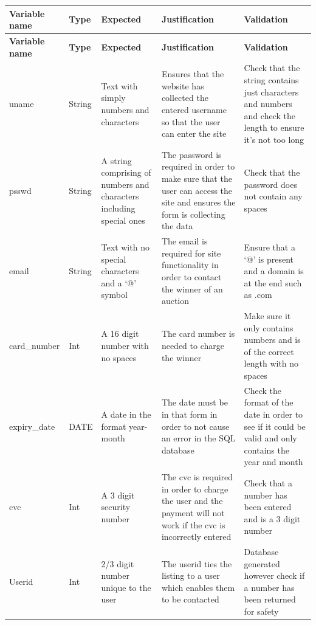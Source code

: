 \begin{center}
\begin{longtable}{|P{1.7cm}|P{1cm}|P{3.5cm}|P{3cm}|P{3cm}|}
  \hline
  \textbf{Variable name} & \textbf{Type} & \textbf{Expected} & \textbf{Justification} & \textbf{Validation} \\
  \hline
  \endfirsthead
  \hline
  \textbf{Variable name} & \textbf{Type} & \textbf{Expected} & \textbf{Justification} & \textbf{Validation} \\
  \hline
  \endhead
  \hline 

  \endfoot
  \endlastfoot
  
    uname & String & Text with simply numbers and characters & Ensures that the website has collected the entered username so that the user can enter the site & Check that the string contains just characters and numbers and check the length to ensure it’s not too long \\ \hline
        psswd & String & A string comprising of numbers and characters including special ones & The password is required in order to make sure that the user can access the site and ensures the form is collecting the data & Check that the password does not contain any spaces \\ \hline
        email & String & Text with no special characters and a ‘@’ symbol & The email is required for site functionality in order to contact the winner of an auction & Ensure that a ‘@’ is present and a domain is at the end such as .com \\ \hline
        card\_number & Int & A 16 digit number with no spaces & The card number is needed to charge the winner & Make sure it only contains numbers and is of the correct length with no spaces \\ \hline
        expiry\_date & DATE & A date in the format year-month & The date must be in that form in order to not cause an error in the SQL database & Check the format of the date in order to see if it could be valid and only contains the year and month \\ \hline
        cvc & Int & A 3 digit security number & The cvc is required in order to charge the user and the payment will not work if the cvc is incorrectly entered & Check that a number has been entered and is a 3 digit number \\ \hline
        Userid & Int & 2/3 digit number unique to the user & The userid ties the listing to a user which enables them to be contacted & Database generated however check if a number has been returned for safety \\ \hline

\end{longtable}
\end{center}
